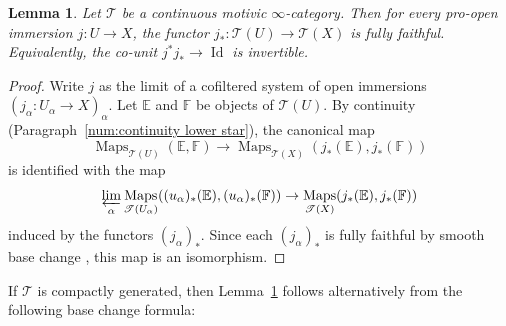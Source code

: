 \documentclass[JEP,XML,SOM,Unicode]{cedram}
\newcommand{\T}{\mathscr T}
\newcommand{\E}{\mathbb E}
\newcommand{\F}{\mathbb F}
\DeclareMathOperator{\Id}{Id}
\DeclareMathOperator{\Maps}{Maps}
\DeclareMathOperator{\plim}{\varprojlim}
\newtheorem{lm}[thm]{Lemma}
\theoremstyle{remark}
\theoremstyle{definition}
\numberwithin{equation}{thm}
\begin{document}

\begin{lm}\label{lm:pro-open immersion}
Let $\T$ be a continuous motivic $\infty$-category.
Then for every pro-open immersion $j : U \to X$, the functor $j_* : \T(U) \to \T(X)$ is fully faithful.
Equivalently, the co-unit $j^*j_* \to \Id$ is invertible.
\end{lm}
\begin{proof}
Write $j$ as the limit of a cofiltered system of open immersions \hbox{$(j_\alpha\!:\!U_\alpha\!\to\!X)_\alpha$}.
Let $\E$ and $\F$ be objects of $\T(U)$.
By continuity (Paragraph~\ref{num:continuity lower star}), the canonical map
\[
\Maps_{\T(U)}(\E, \F)
\to \Maps_{\T(X)}(j_*(\E), j_*(\F))
\]
is identified with the map
\[
\plim_\alpha \Maps_{\T(U_\alpha)}((u_\alpha)_*(\E), (u_\alpha)_*(\F))
\to \Maps_{\T(X)}(j_*(\E), j_*(\F))
\]
induced by the functors $(j_\alpha)_*$.
Since each $(j_\alpha)_*$ is fully faithful by smooth base change \cite[1.1.20]{CD3}, this map is an isomorphism.
\end{proof}

If $\T$ is compactly generated, then Lemma~\ref{lm:pro-open immersion} follows alternatively from the following base change formula:
\end{document}
